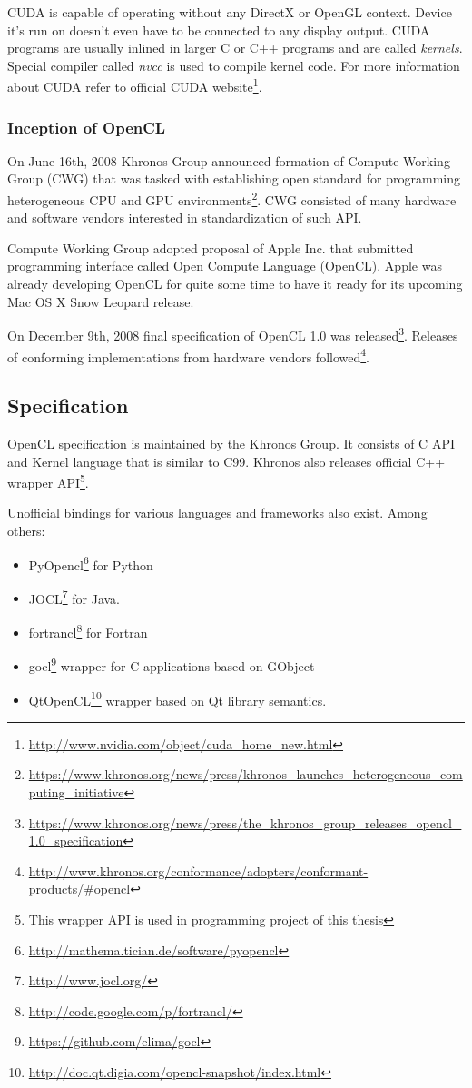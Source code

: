 CUDA is capable of operating without any DirectX or OpenGL context. Device it's
run on doesn't even have to be connected to any display output. CUDA programs
are usually inlined in larger C or C++ programs and are called \emph{kernels}.
Special compiler called \emph{nvcc} is used to compile kernel code. For more
information about CUDA refer to official CUDA
website\footnote{\url{http://www.nvidia.com/object/cuda_home_new.html}}.

\subsubsection{Inception of OpenCL}

On June 16th, 2008 Khronos Group announced formation of Compute Working Group (CWG)
that was tasked with establishing open standard for programming heterogeneous
CPU and GPU environments\footnote{\url{https://www.khronos.org/news/press/khronos\_launches\_heterogeneous\_computing\_initiative}}.
CWG consisted of many hardware and software vendors interested in
standardization of such API.

Compute Working Group adopted proposal of Apple Inc. that submitted programming
interface called Open Compute Language (OpenCL). Apple was already developing
OpenCL for quite some time to have it ready for its upcoming Mac OS X Snow
Leopard release.

On December 9th, 2008 final specification of OpenCL 1.0 was
released\footnote{\url{https://www.khronos.org/news/press/the\_khronos\_group\_releases\_opencl\_1.0\_specification}}.
Releases of conforming implementations from hardware vendors followed\footnote{\url{http://www.khronos.org/conformance/adopters/conformant-products/\#opencl}}.

\subsection{Specification}
OpenCL specification is maintained by the Khronos Group. It consists of C API
and Kernel language that is similar to C99. Khronos also releases official C++
wrapper API\footnote{This wrapper API is used in programming project of this thesis}.

Unofficial bindings for various languages and frameworks also exist. Among others:
\begin{itemize}
	\item PyOpencl\footnote{\url{http://mathema.tician.de/software/pyopencl}}
		for Python
	\item JOCL\footnote{\url{http://www.jocl.org/}} for Java.
	\item fortrancl\footnote{\url{http://code.google.com/p/fortrancl/}} for Fortran
	\item gocl\footnote{\url{https://github.com/elima/gocl}} wrapper for C
		applications based on GObject
	\item QtOpenCL\footnote{\url{http://doc.qt.digia.com/opencl-snapshot/index.html}}
		wrapper based on Qt library semantics.
\end{itemize}

